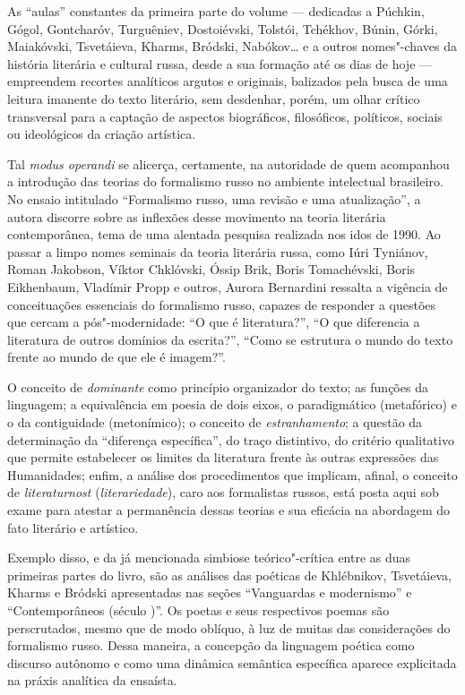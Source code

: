 As ``aulas'' constantes da primeira parte do volume --- dedicadas a
Púchkin, Gógol, Gontcharóv, Turguêniev, Dostoiévski, Tolstói, Tchékhov,
Búnin, Górki, Maiakóvski, Tsvetáieva, Kharms, Bródski, Nabókov\ldots{} e a outros nomes"-chaves da
história literária e cultural russa, desde a sua formação até os dias de
hoje --- empreendem recortes analíticos argutos e originais, balizados pela busca de uma leitura imanente do
texto literário, sem desdenhar, porém, um olhar crítico transversal para
a captação de aspectos biográficos, filosóficos, políticos, sociais ou
ideológicos da criação artística.

Tal \emph{modus operandi} se alicerça, certamente, na autoridade de quem
acompanhou a introdução das teorias do formalismo russo no ambiente
intelectual brasileiro. No ensaio intitulado ``Formalismo
russo, uma revisão e uma atualização'', a autora discorre sobre as
inflexões desse movimento na teoria literária contemporânea,
tema de uma alentada pesquisa realizada nos idos de 1990. Ao
passar a limpo nomes seminais da teoria literária russa, como Iúri
Tyniánov, Roman Jakobson, Víktor Chklóvski, Óssip Brik, Boris Tomachévski,
Boris Eikhenbaum, Vladímir Propp e outros, Aurora Bernardini ressalta a
vigência de conceituações essenciais do formalismo russo, capazes de
responder a questões que cercam a pós"-modernidade: ``O que é
literatura?'', ``O que diferencia a literatura de outros domínios da
escrita?'', ``Como se estrutura o mundo do texto frente ao mundo de que
ele é imagem?''.

O conceito de \emph{dominante} como princípio organizador do texto; as
funções da linguagem; a equivalência em poesia de dois
eixos, o paradigmático (metafórico) e o da contiguidade (metonímico); o
conceito de \emph{estranhamento}; a questão da determinação da ``diferença
específica'', do traço distintivo, do critério qualitativo que permite estabelecer os limites da literatura frente às outras
expressões das Humanidades; enfim, a análise dos procedimentos que
implicam, afinal, o conceito de \emph{literaturnost} (\emph{literariedade}), caro
aos formalistas russos, está posta aqui sob exame para atestar
a permanência dessas teorias e sua eficácia na abordagem do fato
literário e artístico.

Exemplo disso, e da já mencionada simbiose teórico"-crítica entre as duas
primeiras partes do livro, são as análises das poéticas de Khlébnikov, Tsvetáieva,
Kharms e Bródski apresentadas nas seções ``Vanguardas e modernismo'' e ``Contemporâneos (século \scalebox{0.8}{XX})''. Os
poetas e seus respectivos poemas são perscrutados, mesmo que de modo
oblíquo, à luz de muitas das considerações do formalismo russo. Dessa maneira, a
concepção da linguagem poética como discurso autônomo e como uma
dinâmica semântica específica aparece explicitada na práxis analítica da ensaísta.

